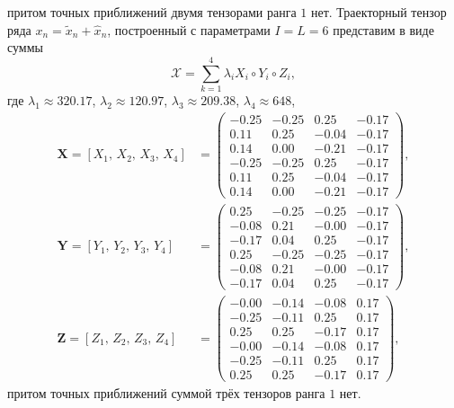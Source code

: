 \documentclass[specialist,
    substylefile=spbu.rtx,
    subf,href,colorlinks=true, 12pt]{disser}
\theoremstyle{plain}
\theoremstyle{definition}
\theoremstyle{remark}
\begin{document}
    притом точных приближений двумя тензорами ранга $1$ нет.
    Траекторный тензор ряда $x_n=\tilde{x}_n+\hat{x}_n$, построенный с параметрами $I=L=6$ представим в виде суммы
    \[
        \mathcal{X}=\sum_{k=1}^{4}\lambda_i X_i \circ Y_i\circ Z_i,
    \]
    где $\lambda_1 \approx 320.17$, $\lambda_2 \approx 120.97$, $\lambda_3 \approx 209.38$, $\lambda_4 \approx 648$,
    \begin{align*}
        \mathbf{X}=[X_1,\, X_2,\, X_3,\, X_4] &=
        \begin{pmatrix}
            -0.25 & -0.25 & 0.25  & -0.17 \\
            0.11  & 0.25  & -0.04 & -0.17 \\
            0.14  & 0.00  & -0.21 & -0.17 \\
            -0.25 & -0.25 & 0.25  & -0.17 \\
            0.11  & 0.25  & -0.04 & -0.17 \\
            0.14  & 0.00  & -0.21 & -0.17
        \end{pmatrix},\\
        \mathbf{Y}=[Y_1,\, Y_2,\, Y_3,\, Y_4] &=
        \begin{pmatrix}
            0.25  & -0.25 & -0.25 & -0.17 \\
            -0.08 & 0.21  & -0.00 & -0.17 \\
            -0.17 & 0.04  & 0.25  & -0.17 \\
            0.25  & -0.25 & -0.25 & -0.17 \\
            -0.08 & 0.21  & -0.00 & -0.17 \\
            -0.17 & 0.04  & 0.25  & -0.17
        \end{pmatrix},\\
        \mathbf{Z}=[Z_1,\, Z_2,\, Z_3,\, Z_4] &=
        \begin{pmatrix}
            -0.00 & -0.14 & -0.08 & 0.17 \\
            -0.25 & -0.11 & 0.25  & 0.17 \\
            0.25  & 0.25  & -0.17 & 0.17 \\
            -0.00 & -0.14 & -0.08 & 0.17 \\
            -0.25 & -0.11 & 0.25  & 0.17 \\
            0.25  & 0.25  & -0.17 & 0.17
        \end{pmatrix},
    \end{align*}
    притом точных приближений суммой трёх тензоров ранга $1$ нет.
\end{document}
